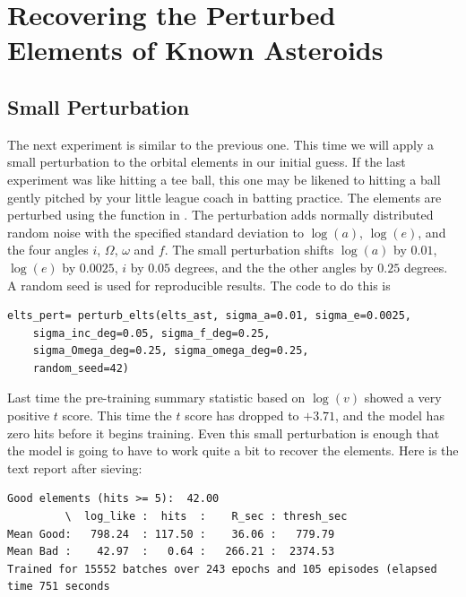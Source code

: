 \section{Recovering the Perturbed Elements of Known Asteroids}
\label{section_results_known_ast_perturbed}

\subsection{Small Perturbation}
The next experiment is similar to the previous one.
This time we will apply a small perturbation to the orbital elements in our initial guess.
If the last experiment was like hitting a tee ball, this one may be likened to hitting a ball gently pitched by your little league coach in batting practice.
The elements are perturbed using the function  in .
The perturbation adds normally distributed random noise with the specified standard deviation
to $\log(a)$, $\log(e)$, and the four angles $i$, $\Omega$, $\omega$ and $f$.
The small perturbation shifts $\log(a)$ by $0.01$, $\log(e)$ by $0.0025$, $i$ by $0.05$ degrees,
and the the other angles by $0.25$ degrees.
A random seed is used for reproducible results.
The code to do this is
\begin{lstlisting}[style=CodeSnippet]
elts_pert= perturb_elts(elts_ast, sigma_a=0.01, sigma_e=0.0025, 
	sigma_inc_deg=0.05, sigma_f_deg=0.25, 
	sigma_Omega_deg=0.25, sigma_omega_deg=0.25,
	random_seed=42)
\end{lstlisting}
Last time the pre-training summary statistic based on $\log(v)$ showed a very positive $t$ score.
This time the $t$ score has dropped to $+3.71$, and the model has zero hits before it begins training.
Even this small perturbation is enough that the model is going to have to work quite a bit to recover the elements.
Here is the text report after sieving:
\begin{lstlisting}[style=CodeSnippet]
Good elements (hits >= 5):  42.00
         \  log_like :  hits  :    R_sec : thresh_sec
Mean Good:   798.24  : 117.50 :    36.06 :   779.79
Mean Bad :    42.97  :   0.64 :   266.21 :  2374.53
Trained for 15552 batches over 243 epochs and 105 episodes (elapsed time 751 seconds
\end{lstlisting}

